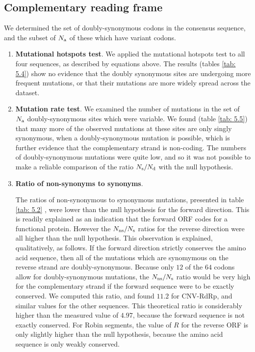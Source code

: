 \documentclass[unnumsec,webpdf,contemporary,large,namedate]{oup-authoring-template}%
\theoremstyle{thmstyleone}%
\theoremstyle{thmstyletwo}%
\theoremstyle{thmstylethree}%
\begin{document}
\subsection{Complementary reading frame}
\label{sec: 5.2}

We determined the set of  doubly-synonymous codons in the consensus sequence, and
the subset of $N_{\rm a}$ of these which have variant codons.

\begin{enumerate}

\item{\bf Mutational hotspots test}. We applied the mutational hotspots test to all four sequences,
as described by equations \MW{(\ref{eq: 4.1})} above.
The results (tables \ref{tab: 5.4}) show no evidence that the doubly synonymous sites are
undergoing more frequent mutations, or that their mutations are more widely spread across the dataset.

\item{\bf Mutation rate test}. We examined the number of mutations in the set
of $N_{\rm a}$ doubly-synonymous sites which were variable. We found (table \ref{tab: 5.5})
that many more of the observed mutations at these sites are only singly synonymous, when
a doubly-synonymous mutation is possible, which is further evidence that the complementary
strand is non-coding. The numbers of doubly-synonymous mutations
were quite low, and so it was not possible to make a reliable comparison of the
ratio $N_{\rm s}/N_{\rm d}$ with the null hypothesis.

\item{\bf Ratio of non-synonyms to synonyms}.

The ratios of non-synonymous to synonymous mutations, presented in table \ref{tab: 5.2} 
, were
lower than the null hypothesis for the forward direction. This is readily explained as an indication
that the forward ORF codes for a functional protein. However the $N_{\rm ns}/N_{\rm s}$
ratios for the reverse direction were all higher than the null hypothesis. This observation
is explained, qualitatively, as follows.
If the forward direction strictly conserves the amino acid sequence, then all of the mutations
which are synomymous on the reverse strand are doubly-synonymous. Because only
$12$ of the $64$ codons allow for doubly-synonymous mutations, the $N_{\rm ns}/N_{\rm s}$
ratio would be very high for the complementary strand if the forward sequence were to be exactly conserved.
We computed this ratio, and found $11.2$ for CNV-RdRp, and similar values for the other sequences.
This theoretical ratio is considerably higher than the measured value of $4.97$, because the
forward sequence is not exactly conserved. For Robin segments, the value of $R$ for the reverse
ORF is only slightly higher than the null hypothesis, because the amino acid sequence is only weakly
conserved.

\end{enumerate}
\end{document}
